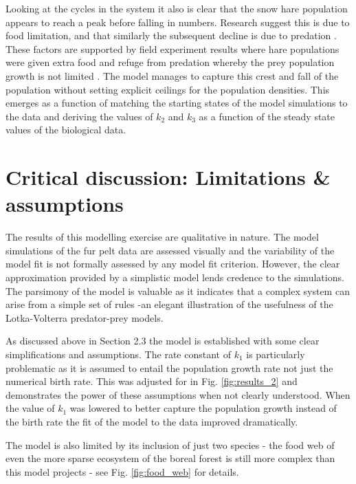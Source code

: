 \documentclass{article}
\begin{document}
Looking at the cycles in the system it also is clear that the snow hare population appears to reach a peak before falling in numbers. Research suggest this is due to food limitation, and that similarly the subsequent decline is due to predation \parencite{king_geometry_2001}. These factors are supported by field experiment results where hare populations were given extra food and refuge from predation whereby the prey population growth is not limited \parencite{king_geometry_2001}. The model manages to capture this crest and fall of the population without setting explicit ceilings for the population densities. This emerges as a function of matching the starting states of the model simulations to the data and deriving the values of $k_2$ and $k_3$ as a function of the steady state values of the biological data. 


\clearpage
\section{Critical discussion: Limitations \& assumptions}
The results of this modelling exercise are qualitative in nature. The model simulations of the fur pelt data are assessed visually and the variability of the model fit is not formally assessed by any model fit criterion. However, the clear approximation provided by a simplistic model lends credence to the simulations. The parsimony of the model is valuable as it indicates that a complex system can arise from a simple set of rules -an elegant illustration of the usefulness of the Lotka-Volterra predator-prey models. 

As discussed above in Section 2.3 the model is established with some clear simplifications and assumptions. The rate constant of $k_1$ is particularly problematic as it is assumed to entail the population growth rate not just the numerical birth rate. This was adjusted for in Fig. \ref{fig:results_2} and demonstrates the power of these assumptions when not clearly understood. When the value of $k_1$ was lowered to better capture the population growth instead of the birth rate the fit of the model to the data improved dramatically.  

The model is also limited by its inclusion of just two species - the food web of even the more sparse ecosystem of the boreal forest is still more complex than this model projects \parencite{stenseth_population_1997} - see Fig. \ref{fig:food_web} for details.
\end{document}
